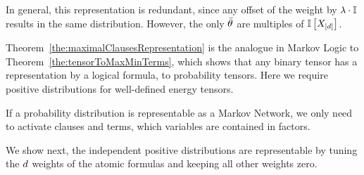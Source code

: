 In general, this representation is redundant, since any offset of the weight by $\lambda\cdot\mathbb{I}$ results in the same distribution.
However, the only $\bar{\theta}$ are multiples of $\mathbb{I}\left[X_{[d]}\right]$.

Theorem~\ref{the:maximalClausesRepresentation} is the analogue in Markov Logic to Theorem~\ref{the:tensorToMaxMinTerms}, which shows that any binary tensor has a representation by a logical formula, to probability tensors.
Here we require positive distributions for well-defined energy tensors.


\begin{remark}
	If a probability distribution is representable as a Markov Network, we only need to activate clauses and terms, which variables are contained in factors.
\end{remark}






We show next, the independent positive distributions are representable by tuning the $d$ weights of the atomic formulas and keeping all other weights zero.


